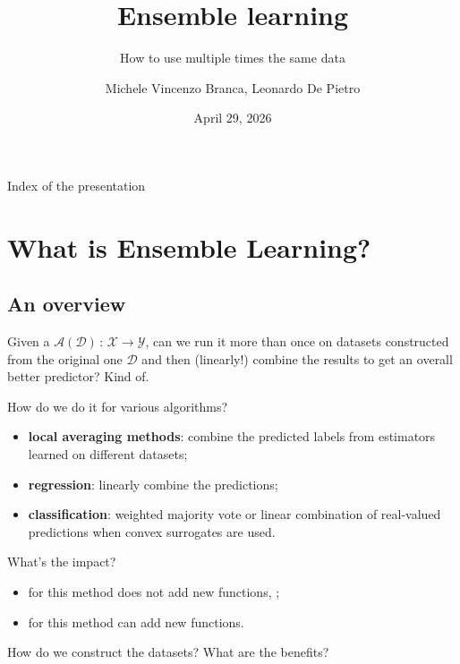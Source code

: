 \documentclass[
11pt,notheorems,hyperref={pdfauthor=whatever}
]{beamer}
\title[
]{Ensemble learning}
\subtitle{How to use multiple times the same data}
\author[
]{
    Michele Vincenzo Branca, Leonardo De Pietro
}
\institute{
    Collegio Carlo Alberto, \\
    University of Turin}
\date{April 29, 2026}
\begin{document}
{
\begin{frame}
  \titlepage
\end{frame}
}
\addtocounter{framenumber}{-1}

\begin{frame}{Index of the presentation}
    \tableofcontents[part=1, hideallsubsections]
    \tableofcontents[part=2, hideallsubsections]
    \tableofcontents[part=3, hideallsubsections]
\end{frame}

\justifying
\section{What is Ensemble Learning?}
\subsection{An overview}
\begin{frame}
    Given a  \(\mathcal{A}(\mathcal{D})\,:\,\mathcal{X}\to\mathcal{Y}\), can we run it more than once on datasets constructed from the original one \(\mathcal{D}\) and then (linearly!) combine the results to get an overall better predictor? Kind of.
    
    How do we do it for various algorithms?
    \begin{itemize}
        \item \alert{\textbf{local averaging methods}}: combine the predicted labels from estimators learned on different datasets;
        \item \alert{\textbf{regression}}: linearly combine the predictions;
        \item \alert{\textbf{classification}}: weighted majority vote or linear combination of real-valued predictions when convex surrogates are used.
    \end{itemize}
    What's the impact?
    \begin{itemize}
    \item for  this method does not add new functions, ;
    \item for  this method can add new functions. 
    \end{itemize}
    How do we construct the datasets? What are the benefits?
\end{frame}
\end{document}
